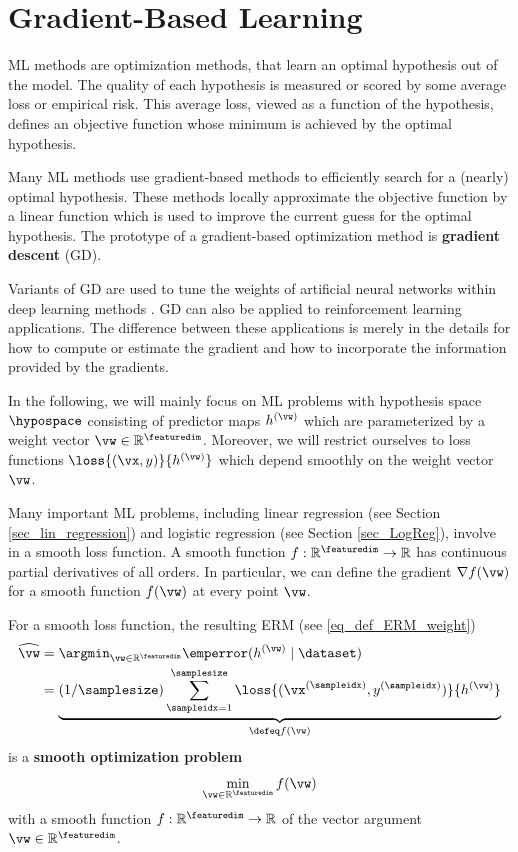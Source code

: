 \documentclass[12pt]{report}
\begin{document}
\newpage
\chapter{Gradient-Based Learning}
\label{ch_GD}

ML methods are optimization methods, that learn an optimal 
hypothesis out of the model. The quality of each hypothesis is 
measured or scored by some average loss or empirical risk. This
average loss, viewed as a function of the hypothesis, defines 
an objective function whose minimum is achieved by the 
optimal hypothesis. 

Many ML methods use gradient-based methods to efficiently search 
for a (nearly) optimal hypothesis. These methods locally 
approximate the objective function by a linear function which 
is used to improve the current guess for the optimal hypothesis. 
The prototype of a gradient-based optimization method is {\bf gradient descent} (GD). 

Variants of GD are used to tune the weights of artificial neural 
networks within deep learning methods \cite{Goodfellow-et-al-2016}. 
GD can also be applied to reinforcement learning applications. The 
difference between these applications is merely in the details for 
how to compute or estimate the gradient and how to incorporate 
the information provided by the gradients. 

In the following, we will mainly focus on ML problems with hypothesis 
space $\hypospace$ consisting of predictor maps $h^{(\vw)}$ 
which are parameterized by a weight vector $\vw \in \mathbb{R}^{\featuredim}$. 
Moreover, we will restrict ourselves to loss functions $\loss{(\vx,y)}{h^{(\vw)}}$ 
which depend smoothly on the weight vector $\vw$. 

Many important ML problems, including linear regression (see Section \ref{sec_lin_regression}) 
and logistic regression (see Section \ref{sec_LogReg}), involve in a smooth loss 
function. A smooth function $f: \mathbb{R}^{\featuredim} \rightarrow \mathbb{R}$ 
has continuous partial derivatives of all orders. In particular, we can define the 
gradient $\nabla f(\vw)$ for a smooth function $f(\vw)$ at every point $\vw$.

For a smooth loss function, the resulting ERM (see \eqref{eq_def_ERM_weight})  
\begin{align}
\label{equ_def_ERM_continous}
\widehat{\vw} & = \argmin_{\vw \in \mathbb{R}^{\featuredim}}  \emperror( h^{(\vw)} \mid \dataset)  \nonumber \\
& = \underbrace{(1/\samplesize) \sum_{\sampleidx=1}^{\samplesize} \loss{(\vx^{(\sampleidx)},y^{(\sampleidx)})}{h^{(\vw)}}}_{\defeq f(\vw)} 
\end{align} 
is a {\bf smooth optimization problem}
\begin{equation}
\label{equ_generic_smooth_problem}
\min_{\vw \in \mathbb{R}^{\featuredim}} f(\vw)
\end{equation} 
with a smooth function $f: \mathbb{R}^{\featuredim} \rightarrow \mathbb{R}$ of 
the vector argument $\vw \in \mathbb{R}^{\featuredim}$. 
\end{document}
